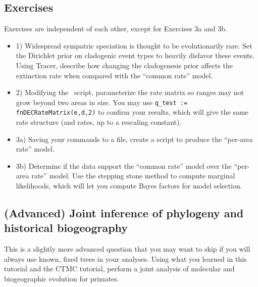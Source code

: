 \subsection{Exercises}

Exercises are independent of each other, except for Exercises 3a and 3b.

\begin{itemize}
\item 1) Widespread sympatric speciation is thought to be evolutionarily rare. Set the Dirichlet prior on cladogenic event types to heavily disfavor these events. Using Tracer, describe how changing the cladogenesis prior affects the extinction rate when compared with the ``common rate'' model.
\item 2) Modifying the \RevBayes~script, parameterize the rate matrix so ranges may not grow beyond two areas in size. You may use {\tt q\_test := fnDECRateMatrix(e,d,2)} to confirm your results, which will give the same rate structure (and rates, up to a rescaling constant).
\item 3a) Saving your commands to a file, create a script to produce the ``per-area rate'' model.
\item 3b) Determine if the data support the ``common rate'' model over the ``per-area rate'' model. Use the stepping stone method to compute marginal likelihoods, which will let you compute Bayes factors for model selection.
\end{itemize}

\subsection{(Advanced) Joint inference of phylogeny and historical biogeography}
This is a slightly more advanced question that you may want to skip if you will always use known, fixed trees in your analyses.
Using what you learned in this tutorial and the CTMC tutorial, perform a joint analysis of molecular and biogeographic evolution for primates. 

